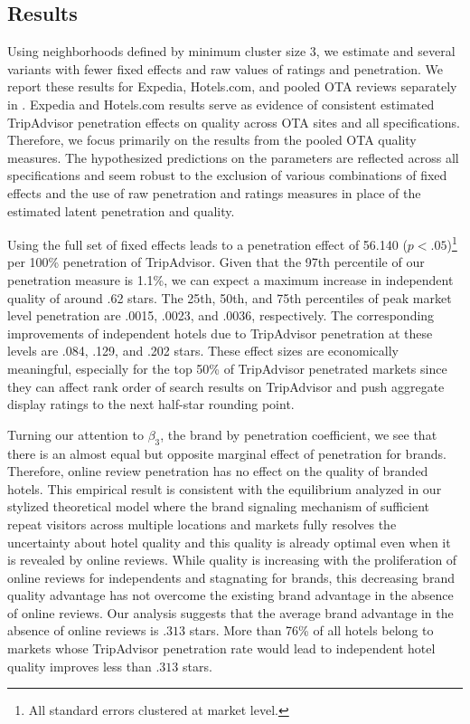 \documentclass[mksc,blindrev]{informs3} %
\begin{document}
\subsection{Results}

Using neighborhoods defined by minimum cluster size 3, we estimate  and several variants with fewer fixed effects and raw values of ratings and penetration. We report these results for Expedia, Hotels.com, and pooled OTA reviews separately in . Expedia and Hotels.com results serve as evidence of consistent estimated TripAdvisor penetration effects on quality across OTA sites and all specifications. Therefore, we focus primarily on the results from the pooled OTA quality measures. The hypothesized predictions on the parameters are reflected across all specifications and seem robust to the exclusion of various combinations of fixed effects and the use of raw penetration and ratings measures in place of the estimated latent penetration and quality. 

Using the full set of fixed effects leads to a penetration effect of 56.140 ($p<.05$)\footnote{All standard errors clustered at market level.} per 100\% penetration of TripAdvisor. Given that the 97th percentile of our penetration measure is 1.1\%, we can expect a maximum increase in independent quality of around .62 stars. The 25th, 50th, and 75th percentiles of peak market level penetration are .0015, .0023, and .0036, respectively. The corresponding improvements of independent hotels due to TripAdvisor penetration at these levels are .084, .129, and .202 stars. These effect sizes are economically meaningful, especially for the top 50\% of TripAdvisor penetrated markets since they can affect rank order of search results on TripAdvisor and push aggregate display ratings to the next half-star rounding point.

Turning our attention to $\beta_3$, the brand by penetration coefficient, we see that there is an almost equal but opposite marginal effect of penetration for brands. Therefore, online review penetration has no effect on the quality of branded hotels. This empirical result is consistent with the equilibrium analyzed in our stylized theoretical model where the brand signaling mechanism of sufficient repeat visitors across multiple locations and markets fully resolves the uncertainty about hotel quality and this quality is already optimal even when it is revealed by online reviews. While quality is increasing with the proliferation of online reviews for independents and stagnating for brands, this decreasing brand quality advantage has not overcome the existing brand advantage in the absence of online reviews. Our analysis suggests that the average brand advantage in the absence of online reviews is $.313$ stars. More than 76\% of all hotels belong to markets whose TripAdvisor penetration rate would lead to independent hotel quality improves less than $.313$ stars. 
\end{document}
